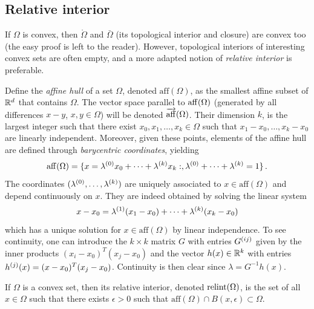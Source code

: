 \subsection{Relative interior}

If $\Omega$ is convex, then $\mathring \Omega$ and $\bar \Omega$ (its topological interior and closure) are convex too (the easy proof is left to the reader).  However, topological interiors of interesting convex sets are often empty, and a more adapted notion of {\em relative interior} is preferable. 

Define the  {\em affine hull} of a set $\Omega$, denoted $\mathrm{aff}(\Omega)$,  as the smallest affine subset of ${\mathbb{R}}^d$ that contains $\Omega$. The vector space parallel to $\mathrm{aff}(\Omega)$ (generated by all differences $x-y$, $x,y\in \Omega$) will be denoted $\overrightarrow{\mathrm{aff}}(\Omega)$.
 Their dimension $k$, is the largest integer such that there exist $x_0, x_1, \ldots, x_k \in \Omega$ such that $x_1-x_0, \ldots, x_k-x_0$ are linearly independent. Moreover, given these points, elements of the affine hull are defined through {\em barycentric coordinates}, yielding
\[
\mathrm{aff}(\Omega) = \{ x =  \lambda^{(0)} x_0 + \cdots + \lambda^{(k)} x_k:, \lambda^{(0)}+\cdots + \lambda^{(k)} = 1\}\,.
\]
The coordinates $(\lambda^{(0)}, \ldots, \lambda^{(k)})$ 
are uniquely  associated to $x\in \mathrm{aff}(\Omega)$ and depend continuously on $x$.
They are indeed obtained by solving the linear system
\[
x - x_0=  \lambda^{(1)} (x_1-x_0) + \cdots + \lambda^{(k)} (x_k-x_0)
\]
which has a unique solution for $x\in \mathrm{aff}(\Omega)$ by linear independence. To see continuity, one can introduce the $k\times k$ matrix $G$ with entries $G^{(ij)}$ given by the inner products $(x_i-x_0)^T(x_j-x_0)$ and the vector $h(x)\in {\mathbb{R}}^k$ with entries $h^{(j)}(x) = (x-x_0)^T(x_j-x_0)$. Continuity is then clear since $\lambda = G^{-1}h(x)$.



\begin{definition}
\label{def:relint}
If $\Omega$ is a convex set, then its relative interior, denoted $\mathrm{relint}(\Omega)$, is the set of all $x\in \Omega$ such that  there exists $\epsilon >0$ such that $\mathrm{aff}(\Omega) \cap B(x, \epsilon) \subset \Omega$.
\end{definition}

